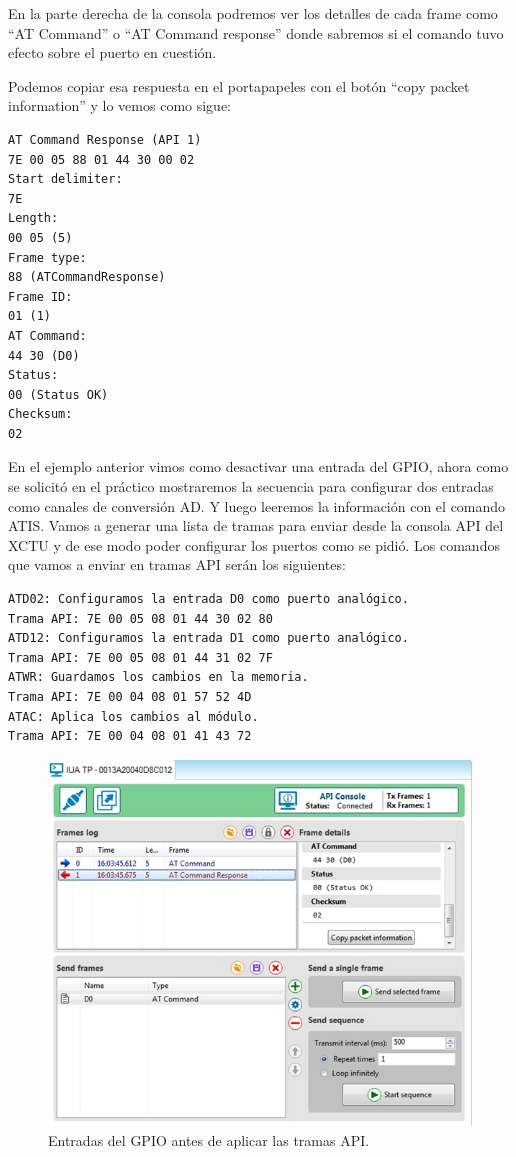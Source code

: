 \documentclass[11pt,oneside,spanish,a4paper]{article}
\begin{document}
En la parte derecha de la consola podremos ver los detalles de cada frame como “AT Command” o “AT Command response” donde sabremos si el comando tuvo efecto sobre el puerto en cuestión.

Podemos copiar esa respuesta en el portapapeles con el botón “copy packet information” y lo vemos como sigue:
\begin{lstlisting}[emph={AT, Command, Response, (API 1),Start, delimiter:,Length:,Frame, type:,Frame, ID:,AT, Command:,Status:,Checksum: }, emphstyle={\color{green}}, label=code:apiEjempl-id]
AT Command Response (API 1)
7E 00 05 88 01 44 30 00 02
Start delimiter:
7E
Length:
00 05 (5)
Frame type:
88 (ATCommandResponse)
Frame ID:
01 (1)
AT Command:
44 30 (D0)
Status:
00 (Status OK)
Checksum:
02
\end{lstlisting}  
En el ejemplo anterior vimos como desactivar una entrada del GPIO, ahora como se solicitó en el práctico mostraremos la secuencia para configurar dos entradas como canales de conversión AD. Y luego leeremos la información con el comando ATIS.
Vamos a generar una lista de tramas para enviar desde la consola API del XCTU y de ese modo poder configurar los puertos como se pidió.
Los comandos que vamos a enviar en tramas API serán los siguientes:
\begin{lstlisting}[emph={ATD02:, Trama API:,ATD12:,ATWR:,ATAC:,}, emphstyle={\color{green}}, label=code:apiEjempl-id]
ATD02: Configuramos la entrada D0 como puerto analógico.
Trama API: 7E 00 05 08 01 44 30 02 80
ATD12: Configuramos la entrada D1 como puerto analógico.
Trama API: 7E 00 05 08 01 44 31 02 7F
ATWR: Guardamos los cambios en la memoria.
Trama API: 7E 00 04 08 01 57 52 4D
ATAC: Aplica los cambios al módulo.
Trama API: 7E 00 04 08 01 41 43 72
\end{lstlisting}  
\begin{figure}[h]
	\centering
	\includegraphics[width=.6\textwidth]{img/IMAGEN15.jpg}
	\caption{Entradas del GPIO antes de aplicar las tramas API.}
\end{figure}
\end{document}
